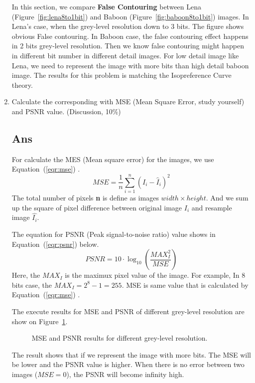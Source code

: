 \documentclass[a4paper, 11pt]{article}
\begin{document}
\begin{enumerate}[label=\alph*.]
\begin{figure}[h]
  \end{figure}
  \newpage
  In this section, we compare \textbf{False Contouring} between Lena 
  (Figure~\ref{fig:lena8to1bit}) and Baboon (Figure~\ref{fig:baboon8to1bit}) images. 
  In Lena's case, when the grey-level resolution down to 3 bits. The figure shows obvious 
  False contouring. In Baboon case, the false contouring effect happens in 2 bits grey-level 
  resolution. Then we know false contouring might happen in different bit number in different
  detail images. For low detail image like Lena, we need to represent the image with more 
  bits than high detail baboon image. The results for this problem is matching the 
  Isopreference Curve theory.
  \item Calculate the corresponding with MSE (Mean Square Error, study yourself) and PSNR value.
  (Discussion, 10\%)
  \subsection*{Ans}
  For calculate the MES (Mean square error) for the images, we use Equation~(\ref{eqr:mse}) 
  \cite{MSE-wiki}.
  \begin{equation}
    MSE=\frac{1}{n}\sum_{i=1}^{n}(I_{i}-\hat{I}_{i})^2
    \label{eqr:mse}
  \end{equation}
  The total number of pixels \textbf{n} is define as images $width \times height$. And 
  we sum up the square of pixel difference between original image \textbf{$I_{i}$} and resample
  image \textbf{$\hat{I_{i}}$}.

  \vspace{1em}
  The equation for PSNR (Peak signal-to-noise ratio) value shows in Equation~(\ref{eqr:psnr}) below.
  \begin{equation}
    PSNR=10\cdot \log_{10}(\frac{MAX_I^2}{MSE})
    \label{eqr:psnr}
  \end{equation}
  Here, the $MAX_I$ is the maximux pixel value of the image. For example, In 8 bits case, the 
  $MAX_I=2^8-1=255$. MSE is same value that is calculated by Equation~(\ref{eqr:mse}) \cite{PSNR-wiki}.

  \vspace{1em}
  The execute results for MSE and PSNR of different grey-level resolution are show on 
  Figure~\ref{fig:hw2_1b}.
  \begin{figure}[h]
    \centering
  \end{figure}
  \begin{figure}[h]
    \centering
    \caption{MSE and PSNR results for different grey-level resolution.}
    \label{fig:hw2_1b}
  \end{figure}

  The result shows that if we represent the image with more bits. The MSE will be lower and 
  the PSNR value is higher. When there is no error between two images ($MSE=0$), the PSNR will 
  become infinity high.
\end{enumerate}
\end{document}
